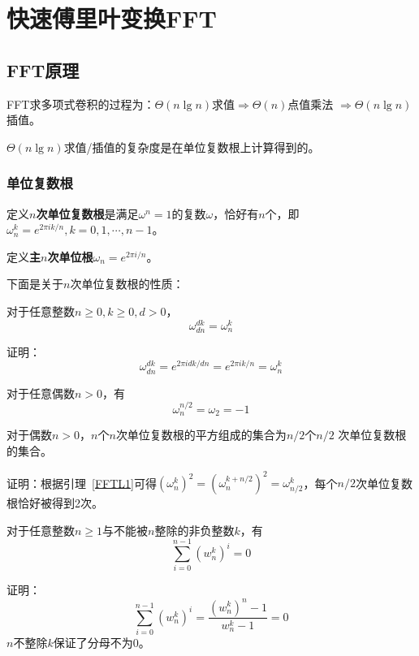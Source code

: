 \section{快速傅里叶变换FFT}
\subsection{FFT原理}
FFT求多项式卷积的过程为：$\Theta(n\lg n)$求值$\Rightarrow \Theta(n)$点值乘法
$\Rightarrow \Theta(n\lg n)$插值。

$\Theta(n\lg n)$求值/插值的复杂度是在单位复数根上计算得到的。

\subsubsection{单位复数根}

定义{\bfseries $n$次单位复数根}是满足$\omega^n=1$的复数$\omega$，恰好有$n$个，即
$\omega_n^k=e^{2\pi ik/n},k=0,1,\cdots,n-1$。

定义{\bfseries 主$n$次单位根}$\omega_n=e^{2\pi i/n}$。

下面是关于$n$次单位复数根的性质：

\begin{lemma}[消去引理]\label{FFTL1}
	对于任意整数$n\geq 0,k \geq 0,d>0$，
	\begin{displaymath}
		\omega_{dn}^{dk}=\omega_n^k
	\end{displaymath}
\end{lemma}
证明：
\begin{displaymath}
	\omega_{dn}^{dk}=e^{2\pi i dk/dn}=e^{2\pi i k/n}=\omega_n^k
\end{displaymath}

\begin{inference}\label{FFTI2}
	对于任意偶数$n>0$，有
	\begin{displaymath}
		\omega_n^{n/2}=\omega_2=-1
	\end{displaymath}
\end{inference}

\begin{lemma}[折半引理]
	对于偶数$n>0$，$n$个$n$次单位复数根的平方组成的集合为$n/2$个$n/2$
	次单位复数根的集合。
\end{lemma}
证明：根据引理~\ref{FFTL1}可得$(\omega_n^k)^2=(\omega_n^{k+n/2})^2=
	\omega_{n/2}^k$，每个$n/2$次单位复数根恰好被得到2次。

\begin{lemma}[求和引理]\label{FFTL4}
	对于任意整数$n\geq 1$与不能被$n$整除的非负整数$k$，有
	\begin{displaymath}
		\sum_{i=0}^{n-1}{(w_n^k)^i}=0
	\end{displaymath}
\end{lemma}
证明：
\begin{displaymath}
	\sum_{i=0}^{n-1}{(w_n^k)^i}=\frac{(w_n^k)^n-1}{w_n^k-1}=0
\end{displaymath}
$n$不整除$k$保证了分母不为0。

